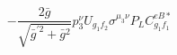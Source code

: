 %
\begin{dmath*}
%
  -  \frac{2 {\bar g}{}}{\sqrt{{\bar g}^{\prime 2} + {\bar g}{}^2}}p_3^{\nu} U_{g_1 f_2} \sigma^{\mu_3 \nu } P_L  C^{eB*}_{g_1 f_1}
%
\end{dmath*}
%
